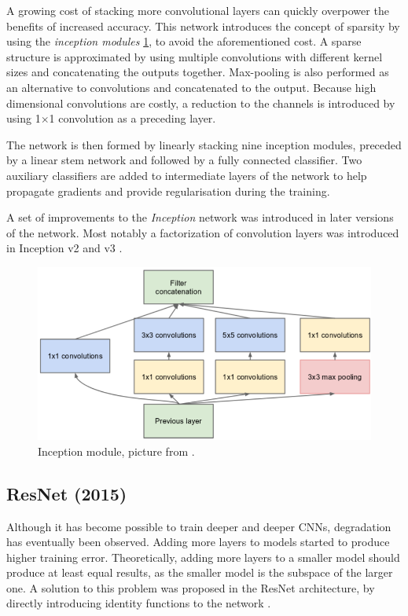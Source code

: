 A growing cost of stacking more convolutional layers can quickly overpower the benefits of increased accuracy. This network introduces the concept of sparsity by using the \textit{inception modules} \cref{fig:incept_mod}, to avoid the aforementioned cost. A sparse structure is approximated by using multiple convolutions with different kernel sizes and concatenating the outputs together. Max-pooling is also performed as an alternative to convolutions and concatenated to the output. Because high dimensional convolutions are costly, a reduction to the channels is introduced by using 1$\times$1 convolution as a preceding layer.

The network is then formed by linearly stacking nine inception modules, preceded by a linear stem network and followed by a fully connected classifier. Two auxiliary classifiers are added to intermediate layers of the network to help propagate gradients and provide regularisation during the training.

A set of improvements to the \textit{Inception} network was introduced in later versions of the network. Most notably a factorization of convolution layers was introduced in Inception v2 and v3 \cite{bib:inception2}.


\begin{figure}
    \includegraphics[width=\textwidth]{img/inception}
    \caption{Inception module, picture from \cite[figure 2]{bib:googlenet}.}
    \label{fig:incept_mod}
\end{figure}

\subsection{ResNet (2015)}
\label{sec:resnet}

Although it has become possible to train deeper and deeper CNNs, degradation has eventually been observed. Adding more layers to models started to produce higher training error. Theoretically, adding more layers to a smaller model should produce at least equal results, as the smaller model is the subspace of the larger one. A solution to this problem was proposed in the ResNet architecture, by directly introducing identity functions to the network \cite{bib:resnet}.  

